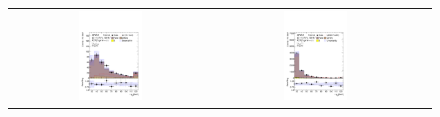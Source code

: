\documentclass[PAPER, coverpage, atlasdraft=true, texlive=2016, UKenglish]{\ATLASLATEXPATH atlasdoc}
\providecommand{\DIFaddend}{} %
\providecommand{\DIFaddbeginFL}{} %
\providecommand{\DIFaddendFL}{} %
\providecommand{\DIFdelbeginFL}{} %
\providecommand{\DIFdelendFL}{} %
\begin{document}
\DIFaddend %
%
\begin{figure}[H]
\centering
\begin{tabular}{@{}ccc@{}}
\DIFdelbeginFL %
\DIFdelendFL \DIFaddbeginFL \includegraphics[page=1,width=0.33\textwidth]{figures/new_pt/reg1l2tau1bnj_os.pdf} \DIFaddendFL &
\DIFdelbeginFL %
\DIFdelendFL \DIFaddbeginFL \includegraphics[page=1,width=0.33\textwidth]{figures/new_pt/reg1l1tau1b1j_ss.pdf}\DIFaddendFL &

\end{tabular}
\end{figure}
\end{document}
